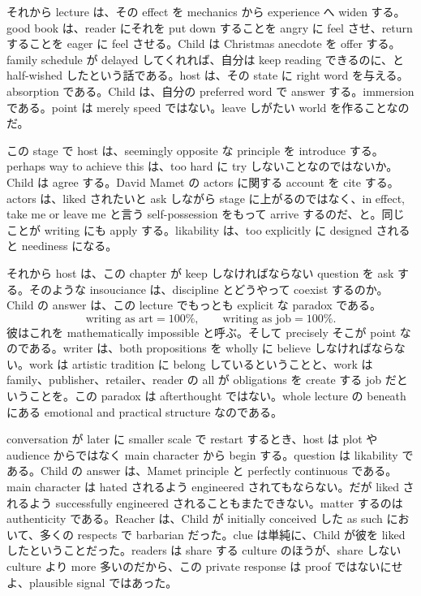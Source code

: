 それから lecture は、その effect を mechanics から experience へ widen する。good book は、reader にそれを put down することを angry に feel させ、return することを eager に feel させる。Child は Christmas anecdote を offer する。family schedule が delayed してくれれば、自分は keep reading できるのに、と half-wished したという話である。host は、その state に right word を与える。absorption である。Child は、自分の preferred word で answer する。immersion である。point は merely speed ではない。leave しがたい world を作ることなのだ。

この stage で host は、seemingly opposite な principle を introduce する。perhaps way to achieve this は、too hard に try しないことなのではないか。Child は agree する。David Mamet の actors に関する account を cite する。actors は、liked されたいと ask しながら stage に上がるのではなく、in effect, take me or leave me と言う self-possession をもって arrive するのだ、と。同じことが writing にも apply する。likability は、too explicitly に designed されると neediness になる。

それから host は、この chapter が keep しなければならない question を ask する。そのような insouciance は、discipline とどうやって coexist するのか。Child の answer は、この lecture でもっとも explicit な paradox である。
\begin{equation}
\text{writing as art} = 100\%, \qquad
\text{writing as job} = 100\%.
\end{equation}
彼はこれを mathematically impossible と呼ぶ。そして precisely そこが point なのである。writer は、both propositions を wholly に believe しなければならない。work は artistic tradition に belong しているということと、work は family、publisher、retailer、reader の all が obligations を create する job だということを。この paradox は afterthought ではない。whole lecture の beneath にある emotional and practical structure なのである。

conversation が later に smaller scale で restart するとき、host は plot や audience からではなく main character から begin する。question は likability である。Child の answer は、Mamet principle と perfectly continuous である。main character は hated されるよう engineered されてもならない。だが liked されるよう successfully engineered されることもまたできない。matter するのは authenticity である。Reacher は、Child が initially conceived した as such において、多くの respects で barbarian だった。clue は単純に、Child が彼を liked したということだった。readers は share する culture のほうが、share しない culture より more 多いのだから、この private response は proof ではないにせよ、plausible signal ではあった。

